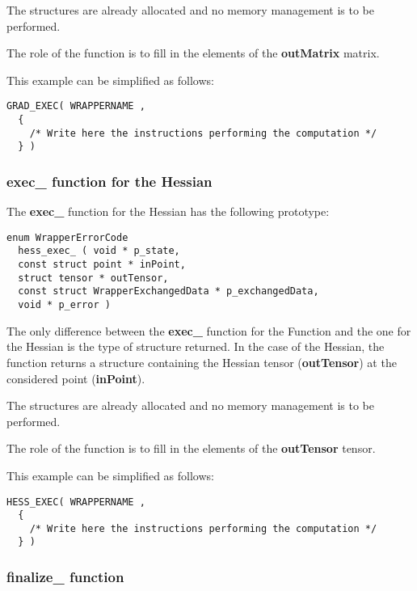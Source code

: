 The structures are already allocated and no memory management is to be performed.

The role of the function is to fill in the elements of the {\bf outMatrix} matrix.

This example can be simplified as follows:
\lstset{language=C++, basicstyle=\normalsize}
\begin{lstlisting}[frame=TBRL]
  GRAD_EXEC( WRAPPERNAME ,
  {
    /* Write here the instructions performing the computation */
  } )
\end{lstlisting}

\subsubsection{exec\_ function for the Hessian}

The {\bf exec\_} function for the Hessian has the following prototype:

\lstset{language=C++, basicstyle=\normalsize}
\begin{lstlisting}[frame=TBRL]
  enum WrapperErrorCode
  hess_exec_ ( void * p_state,
  const struct point * inPoint,
  struct tensor * outTensor,
  const struct WrapperExchangedData * p_exchangedData,
  void * p_error )
\end{lstlisting}

The only difference between the {\bf exec\_} function for the Function and the one for the Hessian is the type of structure returned. In the case of the Hessian, the function returns a  structure containing the Hessian tensor ({\bf outTensor}) at the considered point ({\bf inPoint}).

The structures are already allocated and no memory management is to be performed.

The role of the function is to fill in the elements of the {\bf outTensor} tensor.

This example can be simplified as follows:
\lstset{language=C++, basicstyle=\normalsize}
\begin{lstlisting}[frame=TBRL]
  HESS_EXEC( WRAPPERNAME ,
  {
    /* Write here the instructions performing the computation */
  } )
\end{lstlisting}

\subsubsection{finalize\_ function}

